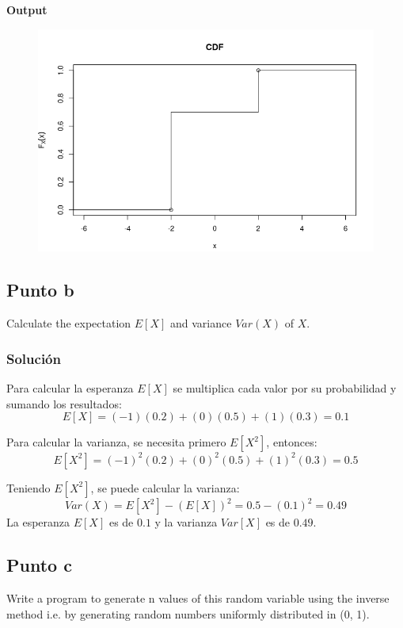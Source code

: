 \documentclass[12pt]{article}
\begin{document}
\textbf{Output}

\begin{figure}[h]
    \centering
    \includegraphics[scale=0.5]{img/cdf.png}
\end{figure}



\subsection{Punto b}

Calculate the expectation $E[X]$ and variance $Var(X)$ of $X$.

\subsubsection{Solución}


Para calcular la esperanza $E[X]$ se multiplica cada valor por su probabilidad y sumando los resultados:
\[E[X] = (-1)(0.2)+(0)(0.5)+(1)(0.3) = 0.1\]

Para calcular la varianza, se necesita primero $E[X^2]$, entonces:
\[E[X^2] = (-1)^2(0.2)+(0)^2(0.5)+(1)^2(0.3) = 0.5\]

Teniendo $E[X^2]$, se puede calcular la varianza:
\[Var(X) = E[X^2] - (E[X])^2 = 0.5-(0.1)^2=0.49\]
La esperanza $E[X]$ es de $0.1$ y la varianza $Var[X]$ es de $0.49$.\newline 




\subsection{Punto c}

Write a program to generate n values of this random variable using the inverse method i.e. by generating random numbers uniformly distributed in (0, 1).
\end{document}
